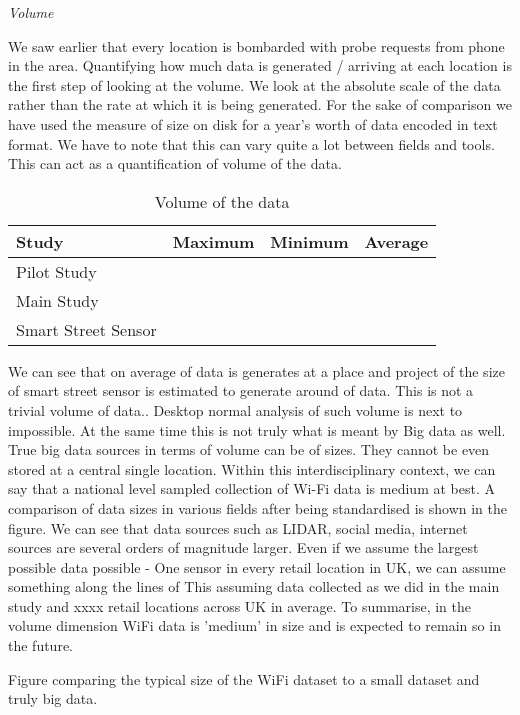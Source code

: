 \textit{Volume}

We saw earlier that every location is bombarded with probe requests from phone in the area.
Quantifying how much data is generated / arriving at each location is the first step of looking at the volume.
We look at the absolute scale of the data rather than the rate at which it is being generated.
For the sake of comparison we have used the measure of size on disk for a year's worth of data encoded in text format.
We have to note that this can vary quite a lot between fields and tools.
This can act as a quantification of volume of the data.

\begin{table}
    \centering
    \begin{tabular}{|l|c|c|c|}
        \hline
        Study & Maximum & Minimum & Average \\
        \hline
        Pilot Study & & & \\
        Main Study & & & \\
        Smart Street Sensor & & & \\
        \hline
    \end{tabular}
    \caption{Volume of the data}
    \label{volume_table}
\end{table}

We can see that on average  of data is generates at a place and project of the size of smart street sensor is estimated to generate around  of data.
This is not a trivial volume of data..
Desktop normal analysis of such volume is next to impossible.
At the same time this is not truly what is meant by Big data as well.
True big data sources in terms of volume can be of  sizes.
They cannot be even stored at a central single location.
Within this interdisciplinary context, we can say that a national level sampled collection of Wi-Fi data is medium at best.
A comparison of data sizes in various fields after being standardised is shown in the figure.
We can see that data sources such as LIDAR, social media, internet sources are several orders of magnitude larger.
Even if we assume the largest possible data possible - One sensor in every retail location in UK, we can assume something along the lines of  This assuming data collected as we did in the main study and xxxx retail locations across UK in average.
To summarise, in the volume dimension WiFi data is 'medium' in size and is expected to remain so in the future.

Figure comparing the typical size of the WiFi dataset to a small dataset and truly big data.

